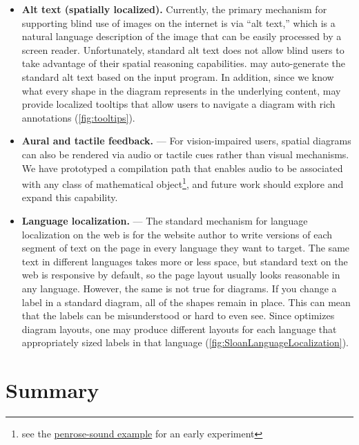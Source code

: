 \begin{itemize}
\item \textbf{Alt text (spatially localized).}
Currently, the primary mechanism for supporting blind use of images on the internet is via ``alt text,'' which is a natural language description of the image that can be easily processed by a screen reader. Unfortunately, standard alt text does not allow blind users to take advantage of their spatial reasoning capabilities. \Penrose{} may auto-generate the standard alt text based on the input \Substance{} program. In addition, since we know what every shape in the diagram represents in the underlying content, \Penrose{} may provide localized tooltips that allow users to navigate a diagram with rich annotations (\cref{fig:tooltips}).  
\item \textbf{Aural and tactile feedback.} --- For vision-impaired users, spatial diagrams can also be rendered via audio or tactile cues rather than visual mechanisms. We have prototyped a compilation path that enables audio to be associated with any class of mathematical object\footnote{see the \href{https://github.com/penrose/penrose/tree/main/packages/examples/src/penrose-sound}{penrose-sound example} for an early experiment}, and future work should explore and expand this capability. 
\item \textbf{Language localization.} --- The standard mechanism for language localization on the web is for the website author to write versions of each segment of text on the page in every language they want to target. The same text in different languages takes more or less space, but standard text on the web is responsive by default, so the page layout usually looks reasonable in any language. However, the same is not true for diagrams. If you change a label in a standard diagram, all of the  shapes remain in place. This can mean that the labels can be misunderstood or hard to even see. Since \Penrose{} optimizes diagram layouts, one may produce different layouts for each language that appropriately sized labels in that language (\cref{fig:SloanLanguageLocalization}).
\end{itemize}


\section{Summary}
\label{sec:DiscussionandFutureWork}


